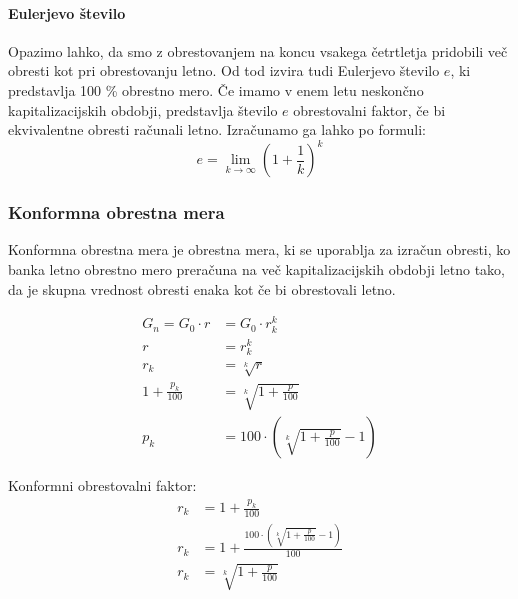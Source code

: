 \documentclass[12pt]{article}
\begin{document}
        \paragraph{Eulerjevo število}
            \label{euler}
            Opazimo lahko, da smo z obrestovanjem na koncu vsakega četrtletja pridobili več obresti
            kot pri obrestovanju letno. Od tod izvira tudi Eulerjevo število $e$, ki predstavlja
            100 \% obrestno mero. Če imamo v enem letu neskončno kapitalizacijskih obdobji,
            predstavlja število $e$ obrestovalni faktor, če bi ekvivalentne obresti računali letno.
            Izračunamo ga lahko po formuli: \hfill \cite{wiki:euler}
            \begin{equation}
                e = \lim_{k \to \infty} (1 + \frac{1}{k})^k
            \end{equation}

        \subsubsection{Konformna obrestna mera}
        \label{konformna}
        Konformna obrestna mera je obrestna mera, ki se uporablja za izračun obresti, ko
        banka letno obrestno mero preračuna na več kapitalizacijskih obdobji letno tako, da
        je skupna vrednost obresti enaka kot če bi obrestovali letno.
        
        \begin{equation}
            \begin{split}
                G_n = G_0 \cdot r & = G_0 \cdot r_k^k \\
                r & = r_k^k \\
                r_k & = \sqrt[k]{r} \\
                1 + \frac{p_k}{100} & = \sqrt[k]{1 + \frac{p}{100}} \\
                p_k & = 100 \cdot (\sqrt[k]{1 + \frac{p}{100}} - 1)
            \end{split}
        \end{equation}

        Konformni obrestovalni faktor:
        \begin{equation}
            \begin{split}
                r_k & = 1 + \frac{p_k}{100} \\
                r_k & = 1 + \frac{100 \cdot (\sqrt[k]{1 + \frac{p}{100}} - 1)}{100} \\
                r_k & = \sqrt[k]{1 + \frac{p}{100}}
            \end{split}
        \end{equation}
\end{document}
